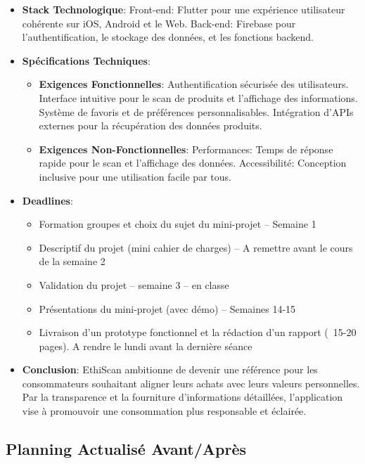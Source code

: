 \documentclass[11pt]{article}
\begin{document}
\begin{itemize}
    \item \textbf{Stack Technologique}: Front-end: Flutter pour une expérience utilisateur cohérente sur iOS, Android et le Web. Back-end: Firebase pour l'authentification, le stockage des données, et les fonctions backend.
    \item \textbf{Spécifications Techniques}:
          \begin{itemize}
              \item \textbf{Exigences Fonctionnelles}: Authentification sécurisée des utilisateurs. Interface intuitive pour le scan de produits et l'affichage des informations. Système de favoris et de préférences personnalisables. Intégration d'APIs externes pour la récupération des données produits.
              \item \textbf{Exigences Non-Fonctionnelles}: Performances: Temps de réponse rapide pour le scan et l'affichage des données. Accessibilité: Conception inclusive pour une utilisation facile par tous.
          \end{itemize}
    \item \textbf{Deadlines}:
          \begin{itemize}
              \item Formation groupes et choix du sujet du mini-projet – Semaine 1
              \item Descriptif du projet (mini cahier de charges) – A remettre avant le cours de la semaine 2
              \item Validation du projet – semaine 3 – en classe
              \item Présentations du mini-projet (avec démo) – Semaines 14-15
              \item Livraison d’un prototype fonctionnel et la rédaction d’un rapport (~15-20 pages). A rendre le lundi avant la dernière séance
          \end{itemize}
    \item \textbf{Conclusion}: EthiScan ambitionne de devenir une référence pour les consommateurs souhaitant aligner leurs achats avec leurs valeurs personnelles. Par la transparence et la fourniture d'informations détaillées, l'application vise à promouvoir une consommation plus responsable et éclairée.
\end{itemize}

\subsection{Planning Actualisé Avant/Après}
\end{document}
